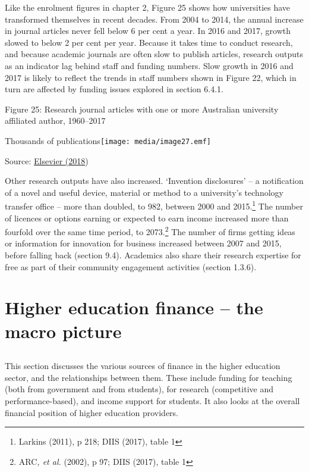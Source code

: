 \documentclass[]{book}
\begin{document}
Like the enrolment figures in chapter 2, Figure 25 shows how universities have transformed themselves in recent decades. From 2004 to 2014, the annual increase in journal articles never fell below 6 per cent a year. In 2016 and 2017, growth slowed to below 2 per cent per year. Because it takes time to conduct research, and because academic journals are often slow to publish articles, research outputs as an indicator lag behind staff and funding numbers. Slow growth in 2016 and 2017 is likely to reflect the trends in staff numbers shown in Figure 22, which in turn are affected by funding issues explored in section 6.4.1.

\protect\hypertarget{_Ref311633596}{}{}Figure 25: Research journal articles with one or more Australian university affiliated author, 1960--2017

Thousands of publications\texttt{[image: media/image27.emf]}

Source: \protect\hyperlink{_ENREF_113}{Elsevier (2018})

Other research outputs have also increased. `Invention disclosures' -- a notification of a novel and useful device, material or method to a university's technology transfer office -- more than doubled, to 982, between 2000 and 2015.\footnote{Larkins (2011), p 218; DIIS (2017), table 1} The number of licences or options earning or expected to earn income increased more than fourfold over the same time period, to 2073.\footnote{ARC\emph{, et al.} (2002), p 97; DIIS (2017), table 1} The number of firms getting ideas or information for innovation for business increased between 2007 and 2015, before falling back (section 9.4). Academics also share their research expertise for free as part of their community engagement activities (section 1.3.6).

\hypertarget{higher-education-finance-the-macro-picture}{%
\chapter{Higher education finance -- the macro picture}\label{higher-education-finance-the-macro-picture}}

\hypertarget{section-8}{%
\section{}\label{section-8}}

This section discusses the various sources of finance in the higher education sector, and the relationships between them. These include funding for teaching (both from government and from students), for research (competitive and performance-based), and income support for students. It also looks at the overall financial position of higher education providers.
\end{document}
